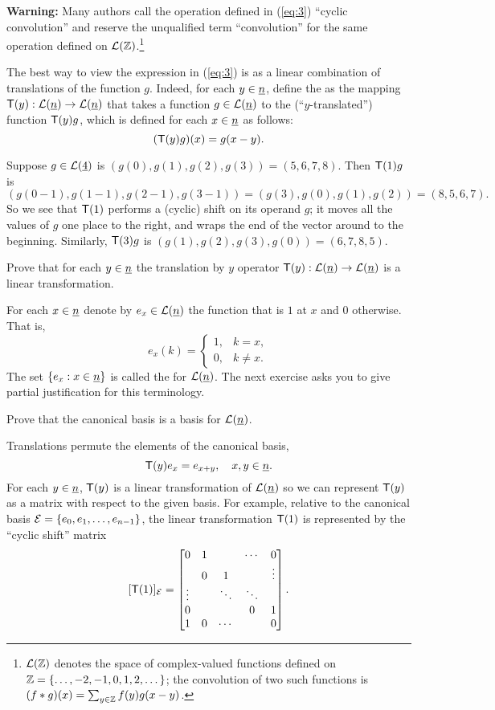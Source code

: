 {\bf Warning:} Many authors call the operation defined in 
(\ref{eq:3}) ``cyclic convolution'' and
reserve the unqualified term ``convolution'' for the same operation defined on
$\mathcal L(\mathbb Z)$.\footnote{$\mathcal L(\mathbb Z)$ denotes the space of complex-valued 
functions defined on $\mathbb Z = \{\dots, -2, -1, 0, 1, 2, \dots\}$; the convolution of 
two such functions is
$(f\ast g)(x) = \sum_{y\in \mathbb Z} f(y) g(x-y)$.
}

The best way to view the expression in (\ref{eq:3}) is as a linear combination
of translations of the function $g$. Indeed, for each $y\in \underline{n}$, define the
 as the mapping $\mathsf{T}(y): \mathcal L(\underline{n}) \to \mathcal L(\underline{n})$ that
takes a function $g\in \mathcal L(\underline{n})$ to the (``$y$-translated'') function 
$\mathsf{T}(y) g$, which is defined for each $x\in \underline{n}$ as follows:
\[
(\mathsf{T}(y) g)(x) = g(x-y).
\]

\begin{example}
  Suppose $g\in \mathcal L(\underline{4})$ is 
  $(g(0), g(1), g(2), g(3)) = (5,6,7,8)$. Then $\mathsf{T}(1)g$ is
  \[
  (g(0-1), g(1-1), g(2-1), g(3-1))
  = (g(3), g(0), g(1), g(2)) = (8,5,6,7).
  \]
So we see that $\mathsf{T}(1)$ performs a (cyclic) shift on its operand $g$; 
it moves all the values of $g$ one place to the right, and wraps the end of the
vector around to the beginning.  Similarly,
$\mathsf{T}(3)g$ is $(g(1), g(2), g(3), g(0)) = (6,7,8,5)$.
\end{example}

\begin{exercise}
  Prove that for each $y\in \underline{n}$ the translation by $y$ operator 
  $\mathsf{T}(y): \mathcal L(\underline{n}) \to \mathcal L(\underline{n})$ is a linear transformation.
\end{exercise}
For each $x\in \underline{n}$ denote by $e_x\in \mathcal L(\underline{n})$ the function that is $1$ at $x$
and $0$ otherwise.  That is, 
\[
e_x(k) = 
\begin{cases}
  1, & k=x,\\
  0, & k\neq x.
\end{cases}
\]
The set $\{e_x : x \in \underline{n}\}$ 
is called the  for $\mathcal L(\underline{n})$.  The next exercise 
asks you to give partial justification for this terminology.
\begin{exercise}
Prove that the canonical basis is a basis for $\mathcal L(\underline{n})$.
\end{exercise}
Translations permute the elements of the canonical basis,
\[
\mathsf{T}(y)e_x = e_{x+y}, \quad x, y \in \underline{n}.
\]
For each $y\in \underline{n}$, $\mathsf{T}(y)$ is a linear transformation of $\mathcal L(\underline{n})$ so we can
represent $\mathsf{T}(y)$ as a matrix with respect to the given basis.
For example, relative to the canonical basis 
$\mathcal E = \{e_0, e_1, \dots, e_{n-1}\}$, the linear transformation $\mathsf{T}(1)$ is
represented by the ``cyclic shift'' matrix
\[
[\mathsf{T}(1)]_{\mathcal E} = 
\begin{bmatrix}
0 & 1    &     &\cdots&  0\\
  & 0    & 1    &     & \vdots\\
\vdots  &      &\ddots&\ddots&        \\
0  &     &      &        0   & 1 \\
1  & 0    &\cdots&      & 0
\end{bmatrix}.
\]

